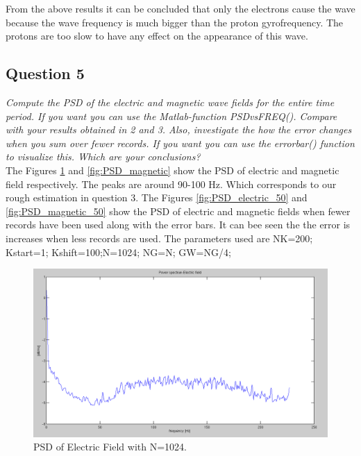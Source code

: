 \documentclass{article}
\begin{document}
From the above results it can be concluded that only the electrons cause the wave because the wave frequency is much bigger than the proton gyrofrequency. The protons are too slow to have any effect on the appearance of this wave.


\subsection{Question 5}
\textit{Compute the PSD of the electric and magnetic wave fields for the entire time period. If you want you can use the Matlab-function PSDvsFREQ(). Compare with your results obtained in 2 and 3. Also, investigate the how the error changes when you sum over fewer records. If you want you can use the errorbar() function to visualize this. Which are your
conclusions?}\\

The Figures \ref{fig:PSD_electric} and \ref{fig:PSD_magnetic} show the PSD of electric and magnetic field respectively. The peaks are around 90-100 Hz. Which corresponds to our rough estimation in question 3. The Figures \ref{fig:PSD_electric_50} and \ref{fig:PSD_magnetic_50} show the PSD of electric and magnetic fields when fewer records have been used along with the error bars. It can bee seen the the error is increases when less records are used. The parameters used are NK=200; Kstart=1; Kshift=100;N=1024; NG=N; GW=NG/4;



\begin{figure}[htb!]
\centering
\includegraphics[width=\textwidth]{Figures/PSD_electric.png}
\caption{PSD of Electric Field with N=1024.}
\label{fig:PSD_electric}
\end{figure}
\end{document}
